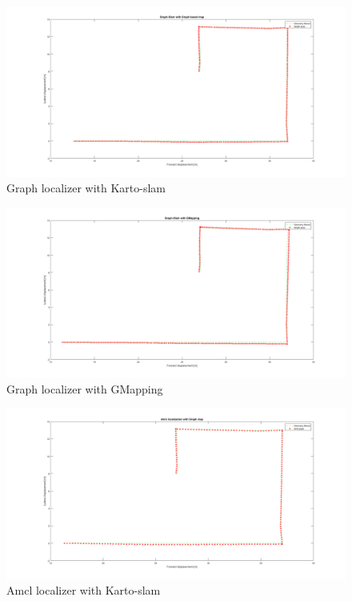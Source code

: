 \documentclass[11pt,a4paper]{article}
\begin{document}
\begin{figure}[H]
	\center
	\includegraphics[width=1\textwidth]{figures/Fig1.png}
	\caption{Graph localizer with Karto-slam}
	\label{fig:fig1}
\end{figure}

\begin{figure}[H]
	\center
	\includegraphics[width=1\textwidth]{figures/Fig2.png}
	\caption{Graph localizer with GMapping}
	\label{fig:fig2}
\end{figure}

\begin{figure}[H]
	\center
	\includegraphics[width=1\textwidth]{figures/Fig3.png}
	\caption{Amcl localizer with Karto-slam}
	\label{fig:fig3}
\end{figure}
\end{document}
